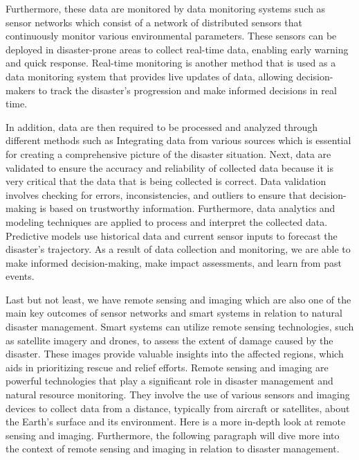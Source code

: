 \documentclass[conference]{IEEEtran}
\begin{document}
Furthermore, these data are monitored by data monitoring systems such as sensor networks which consist of 
a network of distributed sensors that continuously monitor various environmental parameters. These sensors 
can be deployed in disaster-prone areas to collect real-time data, enabling early warning and quick 
response. Real-time monitoring is another method that is used as a data monitoring system that provides 
live updates of data, allowing decision-makers to track the disaster's progression and make informed 
decisions in real time.\par

In addition, data are then required to be processed and analyzed through different methods such as 
Integrating data from various sources which is essential for creating a comprehensive picture of 
the disaster situation. Next, data are validated to ensure the accuracy and reliability of collected 
data because it is very critical that the data that is being collected is correct. Data validation 
involves checking for errors, inconsistencies, and outliers to ensure that decision-making is based 
on trustworthy information. Furthermore, data analytics and modeling techniques are applied to process 
and interpret the collected data. Predictive models use historical data and current sensor inputs to 
forecast the disaster's trajectory. As a result of data collection and monitoring, we are able to make 
informed decision-making, make impact assessments, and learn from past events.\par

Last but not least, we have remote sensing and imaging which are also one of the main key outcomes of 
sensor networks and smart systems in relation to natural disaster management. Smart systems can utilize 
remote sensing technologies, such as satellite imagery and drones, to assess the extent of damage caused 
by the disaster. These images provide valuable insights into the affected regions, which aids in 
prioritizing rescue and relief efforts. Remote sensing and imaging are powerful technologies that play 
a significant role in disaster management and natural resource monitoring. They involve the use of 
various sensors and imaging devices to collect data from a distance, typically from aircraft or satellites, 
about the Earth's surface and its environment. Here is a more in-depth look at remote sensing and 
imaging. Furthermore, the following paragraph will dive more into the context of remote sensing and 
imaging in relation to disaster management.\par
\end{document}

